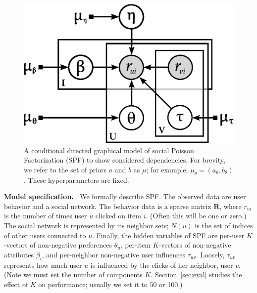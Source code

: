 \documentclass{sig-alternate-2013}
\newcommand{\mypar}[1]{\vspace{0.05in} \noindent \textbf{#1 \,}}
\begin{document}
\begin{figure}[t]
  \begin{center}
    \includegraphics[width=0.69\linewidth]{../fig/graphicalmodel.eps}
    \vspace{-13px}
  \end{center}
  \caption{A conditional directed graphical model of social Poisson
    Factorization (SPF) to show considered dependencies.  For brevity, we refer to the set of priors $a$
    and $b$ as $\mu$; for example, $\mu_\theta = (a_\theta,
    b_\theta)$. These hyperparameters are fixed.}
  \label{fig:graphicalmodel}
\end{figure}

\mypar{Model specification.}  We formally describe SPF. The observed
data are user behavior and a social network.  The behavior data is a
sparse matrix $\mathbf{R}$, where $r_{ui}$ is the number of times user
$u$ clicked on item $i$. (Often this will be one or zero.) The social
network is represented by its neighbor sets; $N(u)$ is the set of
indices of other users connected to $u$.  Finally, the hidden
variables of SPF are per-user $K$-vectors of non-negative preferences
$\theta_u$, per-item $K$-vectors of non-negative attributes $\beta_i$,
and per-neighbor non-negative user influences $\tau_{uv}$. Loosely,
$\tau_{uv}$ represents how much user $u$ is influenced by the
clicks of her neighbor, user $v$.  (Note we must set the number of
components $K$.  Section~\ref{sec:eval} studies the effect of $K$ on
performance; usually we set it to 50 or 100.)
\end{document}
